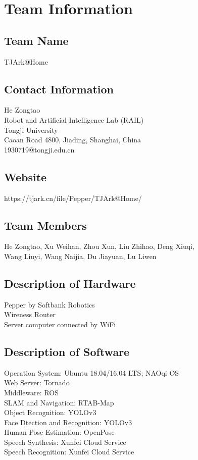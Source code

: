 \section{Team Information}
\label{sec:team}

\subsection*{Team Name}
TJArk@Home

\subsection*{Contact Information}
He Zongtao \\
Robot and Artificial Intelligence Lab (RAIL) \\
Tongji University \\
Caoan Road 4800, Jiading, Shanghai, China \\
1930719@tongji.edu.cn 

\subsection*{Website}
https://tjark.cn/file/Pepper/TJArk@Home/

\subsection*{Team Members}
He Zongtao, Xu Weihan, Zhou Xun, Liu Zhihao, Deng Xiuqi, \\
Wang Liuyi, Wang Naijia, Du Jiayuan, Lu Liwen

\subsection*{Description of Hardware}
Pepper by Softbank Robotics \\
Wireness Router \\
Server computer connected by WiFi \\

\subsection*{Description of Software}
Operation System: Ubuntu 18.04/16.04 LTS; NAOqi OS \\
Web Server: Tornado \\
Middleware: ROS \\
SLAM and Navigation: RTAB-Map \\
Object Recognition: YOLOv3 \\
Face Dtection and Recognition: YOLOv3 \\
Human Pose Estimation:  OpenPose \\
Speech Synthesis: Xunfei Cloud Service\\
Speech Recognition: Xunfei Cloud Service \\